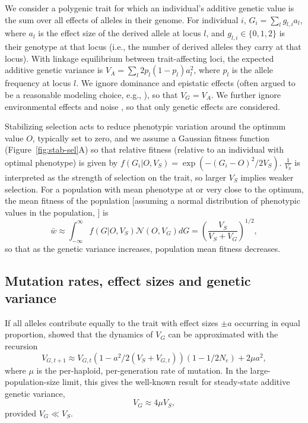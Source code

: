 \documentclass{article}
\begin{document}
We consider a polygenic trait for which an individual's additive genetic value
is the sum over all effects of alleles in their genome. For individual $i$,
\(G_i = \sum_l g_{l, i} a_l\), where $a_l$ is the effect size of the derived
allele at locus $l$, and \(g_{l,i}\in\{0,1,2\}\) is their genotype at that
locus (i.e., the number of derived alleles they carry at that locus). With
linkage equilibrium between trait-affecting loci, the expected additive genetic
variance is \(V_A = \sum_l 2p_l(1-p_l)a_l^2\), where $p_l$ is the allele
frequency at locus $l$. We ignore dominance and epistatic effects (often argued
to be a reasonable modeling choice, e.g., \citet{barton2002understanding,
zhang2002pleiotropic}), so that \(V_G = V_A\). We further ignore environmental
effects and noise \citep[under the assumption of additive environmental
effects, as in][]{lande1975maintenance, simons2018population}, so that only
genetic effects are considered.

Stabilizing selection acts to reduce phenotypic variation around the optimum
value $O$, typically set to zero, and we assume a Gaussian fitness function
(Figure~\ref{fig:stab-sel}A) so that relative fitness (relative to an
individual with optimal phenotype) is given by \(f(G_i | O,
V_S) = \exp{(-(G_i - O)^2 / 2 V_S)}\). $\frac{1}{V_S}$ is interpreted as the
strength of selection on the trait, so larger $V_S$ implies weaker selection.
For a population with mean phenotype at or very close to the optimum, the
mean fitness of the population [assuming a normal distribution of phenotypic
values in the population, \citep{turelli1994genetic, urban2013asymmetric}] is
\[\bar{w} \approx \int_{-\infty}^\infty
f(G | O, V_S) \mathcal{N}(O, V_G) dG =
\left(\frac{V_S}{V_S+V_G}\right)^{1/2},\]
so that as the genetic variance increases, population mean fitness decreases.

\subsection*{Mutation rates, effect sizes and genetic variance}

If all alleles contribute equally to the trait
with effect sizes \(\pm a\) occurring in equal proportion,
\citet{keightley1988quantitative} showed that the dynamics of $V_G$ can be
approximated with the recursion
\[V_{G,t+1} \approx V_{G,t}\left(1-a^2/2(V_S+V_{G,t})\right)
\left(1-1/2N_e\right) + 2 \mu a^2,\]
where $\mu$ is the per-haploid, per-generation rate of mutation. In the
large-population-size limit, this gives the well-known result for
steady-state additive genetic variance,
\[V_G \approx 4\mu V_S,\] provided \(V_G \ll V_S\).
\end{document}
